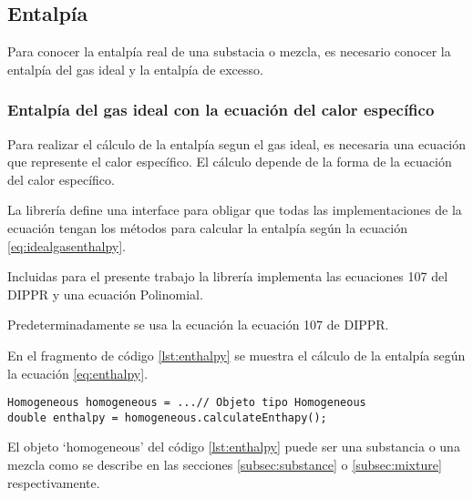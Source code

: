 \subsection{Entalpía}\label{subsec:enthalpy}

	Para conocer la entalpía real de una substacia o mezcla, es necesario conocer la entalpía del gas ideal y la entalpía de excesso.

\subsubsection{Entalpía del gas ideal con la ecuación del calor específico}
	Para realizar el cálculo de la entalpía segun el gas ideal, es necesaria una ecuación que represente el calor específico. El cálculo depende de la forma de la ecuación del calor específico.

	La librería \Materia  define una interface para obligar que todas las implementaciones de la ecuación tengan los métodos para calcular la entalpía según la ecuación \ref{eq:idealgasenthalpy}.

	Incluidas para el presente trabajo la librería \Materia implementa las ecuaciones 107 del DIPPR y una ecuación Polinomial. 
	
	Predeterminadamente se usa la ecuación la ecuación 107 de DIPPR.


	En el fragmento de código \ref{lst:enthalpy} se muestra el cálculo de la entalpía según la ecuación \ref{eq:enthalpy}. 

\begin{lstlisting}[caption={Cálculo de la entalpía},label={lst:enthalpy}]
Homogeneous homogeneous = ...// Objeto tipo Homogeneous
double enthalpy = homogeneous.calculateEnthapy();
\end{lstlisting}
	
	El objeto `homogeneous' del código \ref{lst:enthalpy} puede ser una substancia o una mezcla como se describe en las secciones \ref{subsec:substance} o \ref{subsec:mixture} respectivamente.

\begin{figure}[!h]
	\centering	
	\caption{}\label{fig:2denthalpy}
\end{figure}


